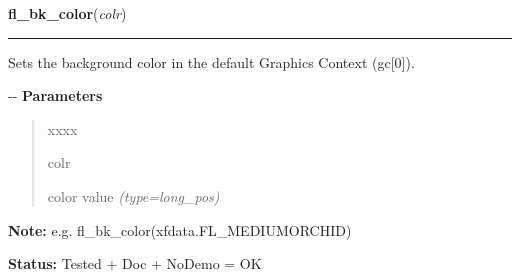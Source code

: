 \hspace{.8\funcindent}\begin{boxedminipage}{\funcwidth}

    \raggedright \textbf{fl\_bk\_color}(\textit{colr})

    \vspace{-1.5ex}

    \rule{\textwidth}{0.5\fboxrule}
\setlength{\parskip}{2ex}

Sets the background color in the default Graphics Context (gc{[}0{]}).

-{}-
\setlength{\parskip}{1ex}
      \textbf{Parameters}
      \vspace{-1ex}

      \begin{quote}
        \begin{Ventry}{xxxx}

          \item[colr]


color value
            {\it (type=long\_pos)}

        \end{Ventry}

      \end{quote}

\textbf{Note:} 
e.g. fl\_bk\_color(xfdata.FL\_MEDIUMORCHID)


\textbf{Status:} 
Tested + Doc + NoDemo = OK


    \end{boxedminipage}

    \label{xformslib:flbasic:fl_textcolor}

    \vspace{0.5ex}

